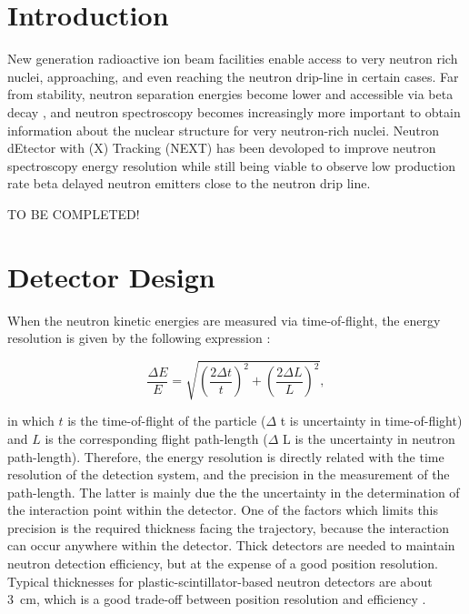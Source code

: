 \documentclass[preprint,3p,twocolumn]{elsarticle}
\begin{document}
\linenumbers

\section{Introduction}
New generation radioactive ion beam facilities enable access to very neutron rich nuclei, approaching, and even reaching the neutron drip-line in certain
cases.
Far from stability, neutron separation energies become lower and accessible via beta decay \cite{FRIB}, and neutron spectroscopy becomes increasingly more important to obtain information about the nuclear structure for very neutron-rich nuclei. 
Neutron dEtector with (X) Tracking (NEXT) has been devoloped to improve neutron spectroscopy energy resolution while still being viable to observe low production rate beta delayed neutron emitters close to the neutron drip line. 

\begin{center}
{ \color{red} TO BE COMPLETED!}
\end{center}
\section{ Detector Design}

When the neutron kinetic  energies are measured via time-of-flight, the energy resolution is given by the following expression \cite{KORNILOV2009226}:

\begin{equation}
\frac{\Delta E}{E}=\sqrt{\left(\frac{2\Delta t}{t}\right )^2+\left(\frac{2\Delta L}{L}\right )^2},
\label{eq:resolution}
\end{equation}

in which $t$  is the time-of-flight of the particle ($\Delta$ t is uncertainty in time-of-flight) and $L$ is the corresponding flight path-length ($\Delta$ L is the uncertainty in neutron path-length). Therefore, the energy resolution is directly related with the time resolution of the detection system, and the precision in the measurement of the path-length. The latter is mainly due the the uncertainty in the determination of the interaction point within the detector. One of the factors which limits this precision is the required thickness facing the trajectory, because the interaction can occur anywhere within the detector. Thick detectors are needed to maintain neutron detection efficiency, but at the expense of a good position resolution. Typical thicknesses for plastic-scintillator-based neutron detectors are about 3~cm, which is a good trade-off between position resolution and efficiency \cite{PETERS2016122,BUTA2000412}.
\end{document}
